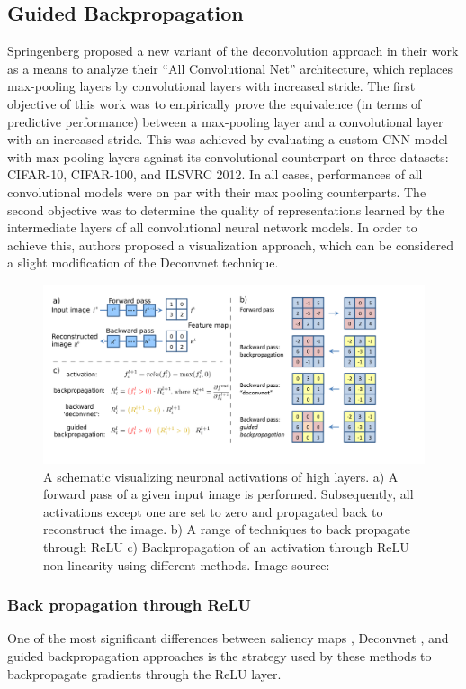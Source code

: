 \documentclass[../report.tex]{subfiles}
\begin{document}
 \subsection{Guided Backpropagation}
 \noindent
 Springenberg \etal \cite{guided_backprop} proposed a new variant of the deconvolution approach in their work as a means to analyze their \enquote{All Convolutional Net} architecture, which replaces max-pooling layers by convolutional layers with increased stride. The first objective of this work was to empirically prove the equivalence (in terms of predictive performance) between a max-pooling layer and a convolutional layer with an increased stride. This was achieved by evaluating a custom CNN model with max-pooling layers against its convolutional counterpart on three datasets: CIFAR-10, CIFAR-100, and ILSVRC 2012. In all cases, performances of all convolutional models were on par with their max pooling counterparts. The second objective was to determine the quality of representations learned by the intermediate layers of all convolutional neural network models. In order to achieve this, authors proposed a visualization approach, which can be considered a slight modification of the Deconvnet technique.
  \begin{figure}[H]
 	\centering
 	\includegraphics[scale=0.25]{images/chapter3/guided_backprop.png}
 	\caption[A schematic visualizing neuronal activations of high layers] {A schematic visualizing neuronal activations of high layers. a) A forward pass of a given input image is performed. Subsequently, all activations except one are set to zero and propagated back to reconstruct the image. b) A range of techniques to back propagate through ReLU c) Backpropagation of an activation through ReLU non-linearity using different methods. Image source: \cite{guided_backprop}}
 	\label{fig_guided_backprop}
 \end{figure}
 
 \subsubsection{Back propagation through ReLU}
 One of the most significant differences between saliency maps \cite{simonyan2013deep}, Deconvnet \cite{matthew2014visualizing}, and guided backpropagation \cite{guided_backprop} approaches is the strategy used by these methods to backpropagate gradients through the ReLU layer. 
 
\end{document}
